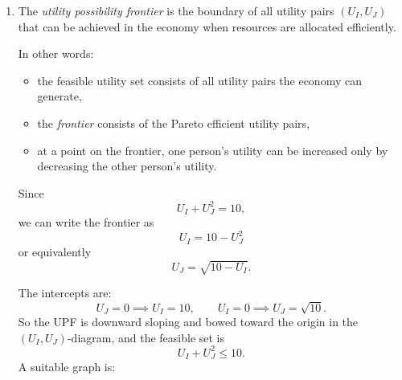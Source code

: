 \documentclass[12pt]{article}
\begin{document}
\begin{enumerate}[label=(\alph*)]
    \item
    The \emph{utility possibility frontier} is the boundary of all utility pairs \((U_I,U_J)\) that can be achieved in the economy when resources are allocated efficiently.

    In other words:
    \begin{itemize}[leftmargin=*]
        \item the feasible utility set consists of all utility pairs the economy can generate,
        \item the \emph{frontier} consists of the Pareto efficient utility pairs,
        \item at a point on the frontier, one person's utility can be increased only by decreasing the other person's utility.
    \end{itemize}

    Since
    \[
    U_I + U_J^2 = 10,
    \]
    we can write the frontier as
    \[
    U_I = 10 - U_J^2
    \]
    or equivalently
    \[
    U_J = \sqrt{10-U_I}.
    \]

    The intercepts are:
    \[
    U_J=0 \implies U_I=10,
    \qquad
    U_I=0 \implies U_J=\sqrt{10}.
    \]
    So the UPF is downward sloping and bowed toward the origin in the \((U_I,U_J)\)-diagram, and the feasible set is
    \[
    \boxed{U_I+U_J^2\le 10.}
    \]
    A suitable graph is:


\end{enumerate}
\end{document}
